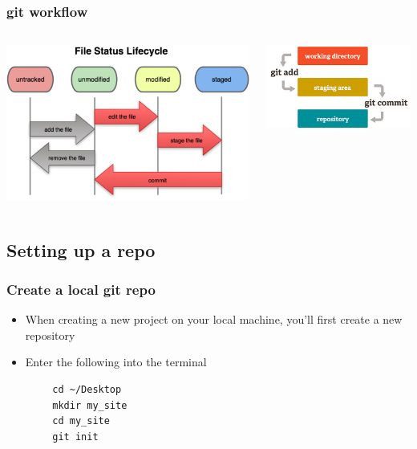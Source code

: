 \documentclass[12pt]{beamer}
\begin{document}
\begin{frame}
\frametitle{git workflow}
\begin{columns}
	\begin{column}{0.5\linewidth}
		\includegraphics[width=\linewidth]{file_workflow}
	\end{column}
	\begin{column}{0.5\linewidth}
		\includegraphics[width=\linewidth]{git_workflow}
	\end{column}
\end{columns}
\end{frame}

\subsection{Setting up a repo}
\begin{frame}[fragile]
\frametitle{Create a local git repo}
\begin{itemize}
	\item When creating a new project on your local machine, you'll first create a new repository
	\item Enter the following into the terminal
\end{itemize}
\begin{center}
	\begin{minipage}{0.5\textwidth}
		\begin{verbatim}
		cd ~/Desktop
		mkdir my_site
		cd my_site
		git init
		\end{verbatim}
	\end{minipage}
\end{center}
\end{frame}
\end{document}

